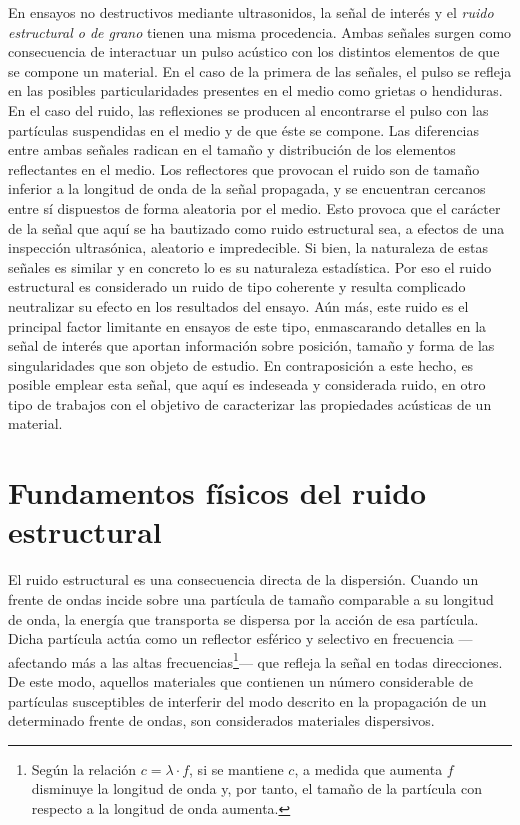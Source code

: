 En ensayos no destructivos mediante ultrasonidos, la señal de interés y el
\emph{ruido estructural o de grano} tienen una misma procedencia. Ambas
señales surgen como consecuencia de interactuar un pulso acústico con los
distintos elementos de que se compone un material. En el caso de la primera
de las señales, el pulso se refleja en las posibles particularidades
presentes en el medio como grietas o hendiduras. En el caso del ruido, las
reflexiones se producen al encontrarse el pulso con las partículas
suspendidas en el medio y de que éste se compone. Las diferencias entre
ambas señales radican en el tamaño y distribución de los elementos
reflectantes en el medio. Los reflectores que provocan el ruido son de
tamaño inferior a la longitud de onda de la señal propagada, y se
encuentran cercanos entre sí dispuestos de forma aleatoria por el medio.
Esto provoca que el carácter de la señal que aquí se ha bautizado como
ruido estructural sea, a efectos de una inspección ultrasónica, aleatorio e
impredecible. Si bien, la naturaleza de estas señales es similar y en
concreto lo es su naturaleza estadística. Por eso el ruido estructural es
considerado un ruido de tipo coherente y resulta complicado neutralizar su
efecto en los resultados del ensayo. Aún más, este ruido es el principal
factor limitante en ensayos de este tipo, enmascarando detalles en la señal
de interés que aportan información sobre posición, tamaño y forma de las
singularidades que son objeto de estudio. En contraposición a este hecho,
es posible emplear esta señal, que aquí es indeseada y considerada ruido,
en otro tipo de trabajos con el objetivo de caracterizar las propiedades
acústicas de un material.


\section{Fundamentos físicos del ruido estructural}

El ruido estructural es una consecuencia directa de la dispersión. Cuando
un frente de ondas incide sobre una partícula de tamaño comparable a su
longitud de onda, la energía que transporta se dispersa por la acción de
esa partícula. Dicha partícula actúa como un reflector esférico y selectivo
en frecuencia ---afectando más a las altas frecuencias\footnote{Según la
relación $c = \lambda\cdot f$, si se mantiene $c$, a medida que aumenta $f$
disminuye la longitud de onda y, por tanto, el tamaño de la partícula con
respecto a la longitud de onda aumenta.}--- que refleja la señal en todas
direcciones. De este modo, aquellos materiales que contienen un número
considerable de partículas susceptibles de interferir del modo descrito en
la propagación de un determinado frente de ondas, son considerados
materiales dispersivos.

